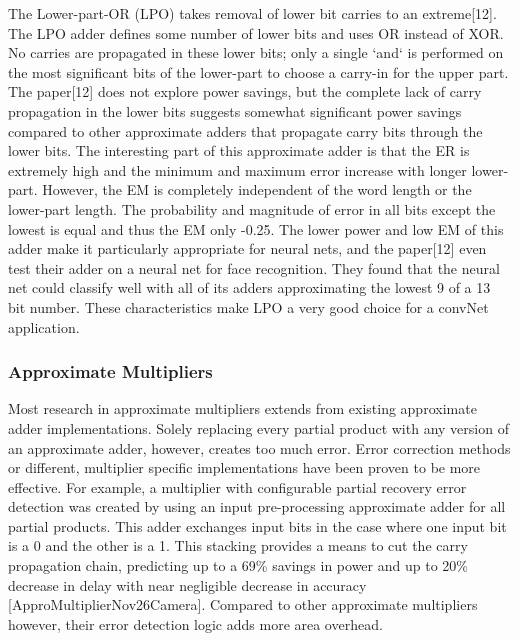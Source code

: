 \documentclass[journal]{IEEEtran}
\begin{document}
	\indent The Lower-part-OR (LPO) takes removal of lower bit carries to an extreme[12]. The LPO adder defines some number of lower bits and uses OR instead of XOR. No carries are propagated in these lower bits; only a single `and` is performed on the most significant bits of the lower-part to choose a carry-in for the upper part. The paper[12] does not explore power savings, but the complete lack of carry propagation in the lower bits suggests somewhat significant power savings compared to other approximate adders that propagate carry bits through the lower bits. The interesting part of this approximate adder is that the ER is extremely high and the minimum and maximum error increase with longer lower-part. However, the EM is completely independent of the word length or the lower-part length. The probability and magnitude of error in all bits except the lowest is equal and thus the EM only -0.25. The lower power and low EM of this adder make it particularly appropriate for neural nets, and the paper[12] even test their adder on a neural net for face recognition. They found that the neural net could classify well with all of its adders approximating the lowest 9 of a 13 bit number. These characteristics make LPO a very good choice for a convNet application.\\
	  
	\subsubsection{Approximate Multipliers}
	\indent Most research in approximate multipliers extends from existing approximate adder implementations. Solely replacing every partial product with any version of an approximate adder, however, creates too much error. Error correction methods or different, multiplier specific implementations have been proven to be more effective. For example, a multiplier with configurable partial recovery error detection was created by using an input pre-processing approximate adder for all partial products. This adder exchanges input bits in the case where one input bit is a 0 and the other is a 1. This stacking provides a means to cut the carry propagation chain, predicting up to a 69\% savings in power and up to 20\% decrease in delay with near negligible decrease in accuracy  [ApproMultiplierNov26Camera]. Compared to other approximate multipliers however, their error detection logic adds more area overhead.\\
	
\end{document}
